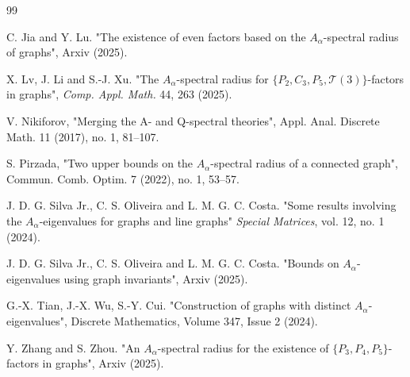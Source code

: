 \documentclass[a4paper,10pt]{article}
\theoremstyle{definition}
\theoremstyle{plain}
\begin{document}
\begin{thebibliography}{99}
%	
	\footnotesize
%

C. Jia and Y. Lu. "The existence of even factors based on the $A_\alpha$-spectral radius of graphs", Arxiv (2025).


X. Lv, J. Li and S.-J. Xu. "The $A_{\alpha }$-spectral radius for $\{P_{2}, C_{3}, P_{5}, \mathcal {T}(3)\}$-factors in graphs", 
\textit{Comp. Appl. Math.} 44, 263 (2025).

V. Nikiforov, "Merging the A- and Q-spectral theories", Appl. Anal. Discrete Math. 11 (2017), no. 1, 81–107.


S. Pirzada, "Two upper bounds on the $A_\alpha$-spectral radius of a connected graph", Commun. Comb. Optim. 7 (2022), no. 1, 53–57.


J. D. G. Silva Jr., C. S. Oliveira and L. M. G. C. Costa. "Some results involving the $A_\alpha$-eigenvalues for graphs and line graphs" \textit{Special Matrices}, vol. 12, no. 1 (2024).


J. D. G. Silva Jr., C. S. Oliveira and L. M. G. C. Costa.  "Bounds on $A_\alpha$-eigenvalues using graph invariants", Arxiv (2025). 

G.-X. Tian, J.-X. Wu, S.-Y. Cui. "Construction of graphs with distinct $A_\alpha$-eigenvalues", Discrete Mathematics, Volume 347, Issue 2 (2024).

Y. Zhang and S. Zhou. "An $A_\alpha$-spectral radius for the existence of $\{P_3, P_4, P_5\}$-factors in graphs", Arxiv (2025). 


\end{thebibliography}


\end{document}

